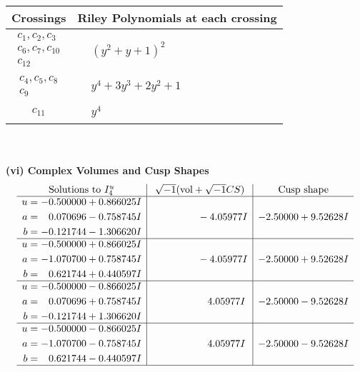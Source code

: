 \documentclass[1p]{elsarticle_modified}
\theoremstyle{definition}
\newcommand{\I}{\sqrt{-1}}
\begin{document}
\begin{tabular}{m{50pt}|m{274pt}}
Crossings & \hspace{64pt}Riley Polynomials at each crossing \\
\hline $$\begin{aligned}c_{1},c_{2},c_{3}\\c_{6},c_{7},c_{10}\\c_{12}\end{aligned}$$&$\begin{aligned}
&(y^2+y+1)^2
\end{aligned}$\\
\hline $$\begin{aligned}c_{4},c_{5},c_{8}\\c_{9}\end{aligned}$$&$\begin{aligned}
&y^4+3 y^3+2 y^2+1
\end{aligned}$\\
\hline $$\begin{aligned}c_{11}\end{aligned}$$&$\begin{aligned}
&y^4
\end{aligned}$\\
\hline
\end{tabular}\\~\\
\newpage\flushleft \textbf{(vi) Complex Volumes and Cusp Shapes}
$$\begin{array}{c|c|c}  
\text{Solutions to }I^u_{4}& \I (\text{vol} + \sqrt{-1}CS) & \text{Cusp shape}\\
 \hline 
\begin{aligned}
u &= -0.500000 + 0.866025 I \\
a &= \phantom{-}0.070696 - 0.758745 I \\
b &= -0.121744 - 1.306620 I\end{aligned}
 & \phantom{-0.000000 } -4.05977 I & -2.50000 + 9.52628 I \\ \hline\begin{aligned}
u &= -0.500000 + 0.866025 I \\
a &= -1.070700 + 0.758745 I \\
b &= \phantom{-}0.621744 + 0.440597 I\end{aligned}
 & \phantom{-0.000000 } -4.05977 I & -2.50000 + 9.52628 I \\ \hline\begin{aligned}
u &= -0.500000 - 0.866025 I \\
a &= \phantom{-}0.070696 + 0.758745 I \\
b &= -0.121744 + 1.306620 I\end{aligned}
 & \phantom{-0.000000 -}4.05977 I & -2.50000 - 9.52628 I \\ \hline\begin{aligned}
u &= -0.500000 - 0.866025 I \\
a &= -1.070700 - 0.758745 I \\
b &= \phantom{-}0.621744 - 0.440597 I\end{aligned}
 & \phantom{-0.000000 -}4.05977 I & -2.50000 - 9.52628 I\\
 \hline 
 \end{array}$$\newpage\newpage\renewcommand{\arraystretch}{1}
\end{document}
